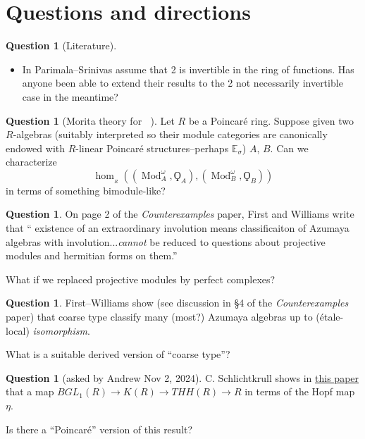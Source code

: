 \documentclass{article}
\DeclareMathOperator{\Catp}{Cat^p_\infty} %
\DeclareMathOperator{\Mod}{Mod} %
\theoremstyle{definition}
\newtheorem{question}[theorem]{Question}
\begin{document}
\section{Questions and directions}
\begin{question}
    [Literature]
\begin{itemize}
    \item In \cite{MR1162189} Parimala--Srinivas assume that 2 is invertible in the ring of functions. 
    Has anyone been able to extend their results to the 2 not necessarily invertible case in the meantime? 
\end{itemize}
\end{question}
\begin{question}
    [Morita theory for $ \Catp $]
    Let $ R $ be a Poincaré ring. 
    Suppose given two $ R $-algebras (suitably interpreted so their module categories are canonically endowed with $ R $-linear Poincaré structures--perhaps $ \mathbb{E}_\sigma $) $ A $, $ B $. 
    Can we characterize
    \begin{equation*}
        \hom_{\Catp_R}\left(\left(\Mod_A^\omega,\Qoppa_A\right),\left(\Mod_B^\omega,\Qoppa_B\right)\right)
     \end{equation*} 
     in terms of something bimodule-like? 
\end{question}
\begin{question}
    On page 2 of the \emph{Counterexamples} paper, First and Williams write that `` existence of an extraordinary involution means classificaiton of Azumaya algebras with involution...\emph{cannot} be reduced to questions about projective modules and hermitian forms on them.'' 

    What if we replaced projective modules by perfect complexes? 
\end{question}
\begin{question}
    First--Williams show (see discussion in \S4 of the \emph{Counterexamples} paper) that coarse type classify many (most?) Azumaya algebras up to (étale-local) \emph{isomorphism}. 

    What is a suitable derived version of ``coarse type''?
\end{question}

\begin{question}
    [asked by Andrew Nov 2, 2024] 
    C. Schlichtkrull shows in \href{https://arxiv.org/pdf/math/0405079}{this paper} that a map $ BGL_1(R) \to K(R) \to THH(R) \to R $ in terms of the Hopf map $ \eta $. 

    Is there a ``Poincaré'' version of this result? 
\end{question}
\end{document}
